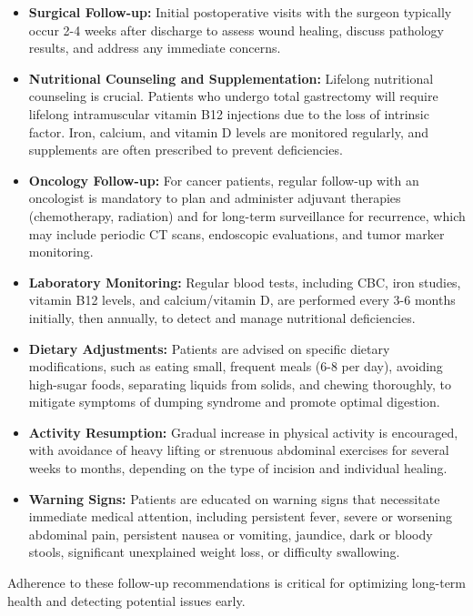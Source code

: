 \begin{itemize}
  \item \textbf{Surgical Follow-up:} Initial postoperative visits with the surgeon typically occur 2-4 weeks after discharge to assess wound healing, discuss pathology results, and address any immediate concerns.
  \item \textbf{Nutritional Counseling and Supplementation:} Lifelong nutritional counseling is crucial. Patients who undergo total gastrectomy will require lifelong intramuscular vitamin B12 injections due to the loss of intrinsic factor. Iron, calcium, and vitamin D levels are monitored regularly, and supplements are often prescribed to prevent deficiencies.
  \item \textbf{Oncology Follow-up:} For cancer patients, regular follow-up with an oncologist is mandatory to plan and administer adjuvant therapies (chemotherapy, radiation) and for long-term surveillance for recurrence, which may include periodic CT scans, endoscopic evaluations, and tumor marker monitoring.
  \item \textbf{Laboratory Monitoring:} Regular blood tests, including CBC, iron studies, vitamin B12 levels, and calcium/vitamin D, are performed every 3-6 months initially, then annually, to detect and manage nutritional deficiencies.
  \item \textbf{Dietary Adjustments:} Patients are advised on specific dietary modifications, such as eating small, frequent meals (6-8 per day), avoiding high-sugar foods, separating liquids from solids, and chewing thoroughly, to mitigate symptoms of dumping syndrome and promote optimal digestion.
  \item \textbf{Activity Resumption:} Gradual increase in physical activity is encouraged, with avoidance of heavy lifting or strenuous abdominal exercises for several weeks to months, depending on the type of incision and individual healing.
  \item \textbf{Warning Signs:} Patients are educated on warning signs that necessitate immediate medical attention, including persistent fever, severe or worsening abdominal pain, persistent nausea or vomiting, jaundice, dark or bloody stools, significant unexplained weight loss, or difficulty swallowing.
\end{itemize}
Adherence to these follow-up recommendations is critical for optimizing long-term health and detecting potential issues early.

